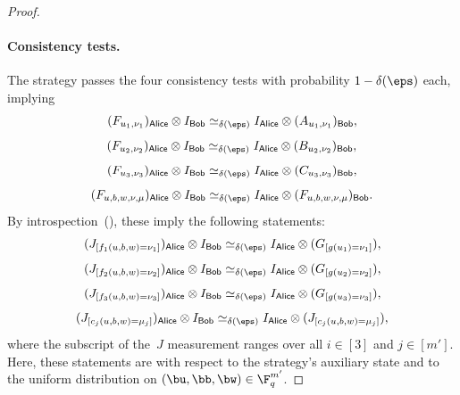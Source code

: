 \documentclass[11pt]{article}
\newcommand{\reg}[1]{{\mathsf{#1}}}
\begin{document}
\begin{proof}
\paragraph{Consistency tests.}
The strategy passes the four consistency tests with probability $1-\delta(\eps)$ each, implying
\begin{equation*}
(F_{u_1, \nu_1})_{\reg{Alice}} \otimes I_{\reg{Bob}} \simeq_{\delta(\eps)} I_{\reg{Alice}} \otimes (A_{u_1, \nu_1})_{\reg{Bob}},
\end{equation*}
\begin{equation*}
(F_{u_2, \nu_2})_{\reg{Alice}} \otimes I_{\reg{Bob}} \simeq_{\delta(\eps)} I_{\reg{Alice}} \otimes (B_{u_2, \nu_2})_{\reg{Bob}},
\end{equation*}
\begin{equation*}
(F_{u_3, \nu_3})_{\reg{Alice}} \otimes I_{\reg{Bob}} \simeq_{\delta(\eps)} I_{\reg{Alice}} \otimes (C_{u_3, \nu_3})_{\reg{Bob}},
\end{equation*}
\begin{equation*}
(F_{u, b, w, \nu, \mu})_{\reg{Alice}} \otimes I_{\reg{Bob}} \simeq_{\delta(\eps)} I_{\reg{Alice}} \otimes (F_{u, b, w, \nu, \mu})_{\reg{Bob}}.
\end{equation*}
By introspection~(), these imply the following statements:
\begin{equation*}
(J_{[f_1(u, b, w) = \nu_1]})_{\reg{Alice}} \otimes I_{\reg{Bob}} \simeq_{\delta(\eps)} I_{\reg{Alice}} \otimes (G_{[g(u_1) = \nu_1]}),
\end{equation*}
\begin{equation*}
(J_{[f_2(u, b, w) = \nu_2]})_{\reg{Alice}} \otimes I_{\reg{Bob}} \simeq_{\delta(\eps)} I_{\reg{Alice}} \otimes (G_{[g(u_2) = \nu_2]}),
\end{equation*}
\begin{equation*}
(J_{[f_3(u, b, w) = \nu_3]})_{\reg{Alice}} \otimes I_{\reg{Bob}} \simeq_{\delta(\eps)} I_{\reg{Alice}} \otimes (G_{[g(u_3) = \nu_3]}),
\end{equation*}
\begin{equation*}
(J_{[c_j(u, b, w) = \mu_j]})_{\reg{Alice}} \otimes I_{\reg{Bob}} \simeq_{\delta(\eps)} I_{\reg{Alice}} \otimes (J_{[c_j(u, b, w) = \mu_j]}),
\end{equation*}
where the subscript of the~$J$ measurement ranges over all $i \in [3]$ and $j \in [m']$.
Here, these statements are with respect to the strategy's auxiliary state and to the uniform distribution on $(\bu, \bb, \bw) \in \F_q^{m'}$.


\end{proof}
\end{document}
